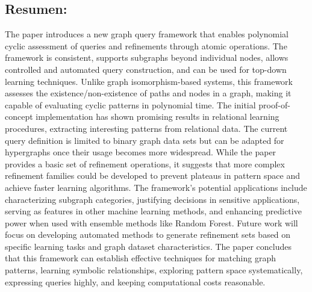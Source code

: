 \documentclass{article}%
\begin{document}
\subsection{Resumen:}%
\label{subsec:Resumen}%
The paper introduces a new graph query framework that enables polynomial cyclic assessment of queries and refinements through atomic operations. The framework is consistent, supports subgraphs beyond individual nodes, allows controlled and automated query construction, and can be used for top{-}down learning techniques. Unlike graph isomorphism{-}based systems, this framework assesses the existence/non{-}existence of paths and nodes in a graph, making it capable of evaluating cyclic patterns in polynomial time. \newline%
\newline%
The initial proof{-}of{-}concept implementation has shown promising results in relational learning procedures, extracting interesting patterns from relational data. The current query definition is limited to binary graph data sets but can be adapted for hypergraphs once their usage becomes more widespread. \newline%
\newline%
While the paper provides a basic set of refinement operations, it suggests that more complex refinement families could be developed to prevent plateaus in pattern space and achieve faster learning algorithms. The framework's potential applications include characterizing subgraph categories, justifying decisions in sensitive applications, serving as features in other machine learning methods, and enhancing predictive power when used with ensemble methods like Random Forest. \newline%
\newline%
Future work will focus on developing automated methods to generate refinement sets based on specific learning tasks and graph dataset characteristics. The paper concludes that this framework can establish effective techniques for matching graph patterns, learning symbolic relationships, exploring pattern space systematically, expressing queries highly, and keeping computational costs reasonable.

%
\end{document}
